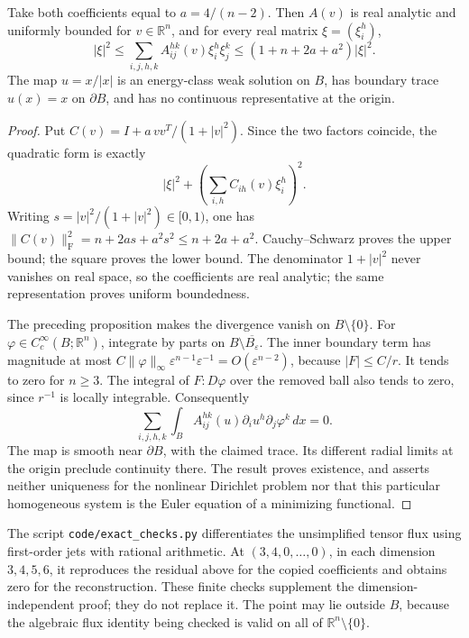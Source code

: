 \begin{proposition}\leavevmode\par\noindent\ours\quad
Take both coefficients equal to \(a=4/(n-2)\). Then \(A(v)\) is real analytic and uniformly bounded for \(v\in\mathbb R^n\), and for every real matrix \(\xi=(\xi_i^h)\),
\[
 |\xi|^2\le
 \sum_{i,j,h,k}A_{ij}^{hk}(v)\xi_i^h\xi_j^k
 \le (1+n+2a+a^2)|\xi|^2.
\]
The map \(u=x/|x|\) is an energy-class weak solution on \(B\), has boundary trace \(u(x)=x\) on \(\partial B\), and has no continuous representative at the origin.
\end{proposition}
\begin{proof}
Put \(C(v)=I+a\,vv^T/(1+|v|^2)\). Since the two factors coincide, the quadratic form is exactly
\[
 |\xi|^2+\left(\sum_{i,h}C_{ih}(v)\xi_i^h\right)^2.
\]
Writing \(s=|v|^2/(1+|v|^2)\in[0,1)\), one has
\(\|C(v)\|_{\mathrm F}^2=n+2as+a^2s^2\le n+2a+a^2\).
Cauchy--Schwarz proves the upper bound; the square proves the lower bound. The denominator \(1+|v|^2\) never vanishes on real space, so the coefficients are real analytic; the same representation proves uniform boundedness.

The preceding proposition makes the divergence vanish on \(B\setminus\{0\}\). For \(\varphi\in C_c^\infty(B;\mathbb R^n)\), integrate by parts on \(B\setminus\overline{B_\varepsilon}\). The inner boundary term has magnitude at most \(C\|\varphi\|_\infty\varepsilon^{n-1}\varepsilon^{-1}=O(\varepsilon^{n-2})\), because \(|F|\le C/r\). It tends to zero for \(n\ge3\). The integral of \(F:D\varphi\) over the removed ball also tends to zero, since \(r^{-1}\) is locally integrable. Consequently
\[
 \sum_{i,j,h,k}\int_B A_{ij}^{hk}(u)\partial_i u^h\partial_j\varphi^k\,dx=0.
\]
The map is smooth near \(\partial B\), with the claimed trace. Its different radial limits at the origin preclude continuity there. The result proves existence, and asserts neither uniqueness for the nonlinear Dirichlet problem nor that this particular homogeneous system is the Euler equation of a minimizing functional.
\end{proof}

\begin{remark}\leavevmode\par\noindent\oursComputed\quad
The script \texttt{code/exact\_checks.py} differentiates the unsimplified tensor flux using first-order jets with rational arithmetic. At \((3,4,0,\ldots,0)\), in each dimension \(3,4,5,6\), it reproduces the residual above for the copied coefficients and obtains zero for the reconstruction. These finite checks supplement the dimension-independent proof; they do not replace it. The point may lie outside \(B\), because the algebraic flux identity being checked is valid on all of \(\mathbb R^n\setminus\{0\}\).
\end{remark}

